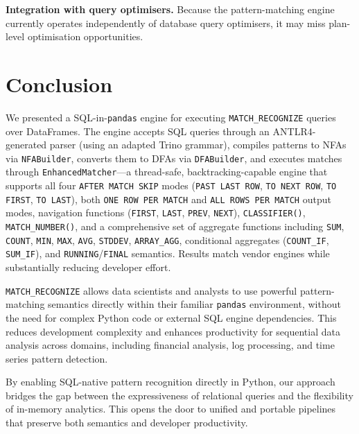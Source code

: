 \textbf{Integration with query optimisers.}
Because the pattern-matching engine currently operates independently of
database query optimisers, it may miss plan-level optimisation
opportunities.

\section{Conclusion}
\label{sec:conclusion}

We presented a SQL-in-\texttt{pandas} engine for executing
\texttt{MATCH\_RECOGNIZE} queries over DataFrames.  The engine accepts
SQL queries through an ANTLR4-generated parser (using an adapted Trino
grammar), compiles patterns to NFAs via \texttt{NFABuilder}, converts
them to DFAs via \texttt{DFABuilder}, and executes matches through
\texttt{EnhancedMatcher}---a thread-safe, backtracking-capable engine
that supports all four \texttt{AFTER MATCH SKIP} modes
(\texttt{PAST LAST ROW}, \texttt{TO NEXT ROW}, \texttt{TO FIRST},
\texttt{TO LAST}), both \texttt{ONE ROW PER MATCH} and
\texttt{ALL ROWS PER MATCH} output modes, navigation functions
(\texttt{FIRST}, \texttt{LAST}, \texttt{PREV}, \texttt{NEXT}),
\texttt{CLASSIFIER()}, \texttt{MATCH\_NUMBER()}, and a comprehensive
set of aggregate functions including \texttt{SUM}, \texttt{COUNT},
\texttt{MIN}, \texttt{MAX}, \texttt{AVG}, \texttt{STDDEV},
\texttt{ARRAY\_AGG}, conditional aggregates (\texttt{COUNT\_IF},
\texttt{SUM\_IF}), and \texttt{RUNNING}/\texttt{FINAL} semantics.
Results match vendor engines while substantially reducing developer effort.

\texttt{MATCH\_RECOGNIZE} allows data scientists and analysts to use
powerful pattern-matching semantics directly within their familiar
\texttt{pandas} environment, without the need for complex Python code or
external SQL engine dependencies.  This reduces development complexity
and enhances productivity for sequential data analysis across domains,
including financial analysis, log processing, and time series pattern
detection.

By enabling SQL-native pattern recognition directly in Python, our
approach bridges the gap between the expressiveness of relational queries
and the flexibility of in-memory analytics.  This opens the door to
unified and portable pipelines that preserve both semantics and developer
productivity.

